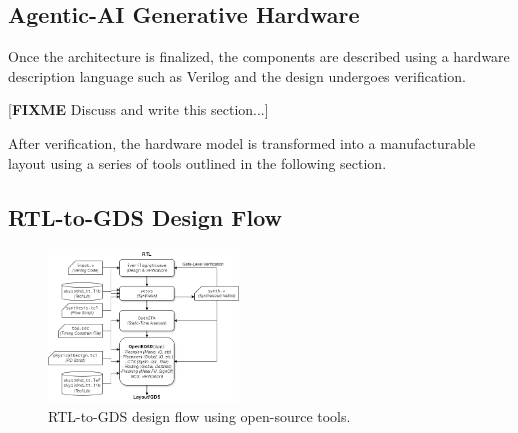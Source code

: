 \subsection{Agentic-AI Generative Hardware}

Once the architecture is finalized, the components are described using a hardware description language such as Verilog and the design undergoes verification. 

[\textbf{FIXME} Discuss and write this section...]

After verification, the hardware model is transformed into a manufacturable layout using a series of tools outlined in the following section.

\subsection{RTL-to-GDS Design Flow}

\begin{figure}[htbp]
	\includegraphics[width=0.45\textwidth]{figs/rtl2gds-toolchain.png}
	\caption{RTL-to-GDS design flow using open-source tools.}
	\label{fig:RTL-to-GDS}
\end{figure}

